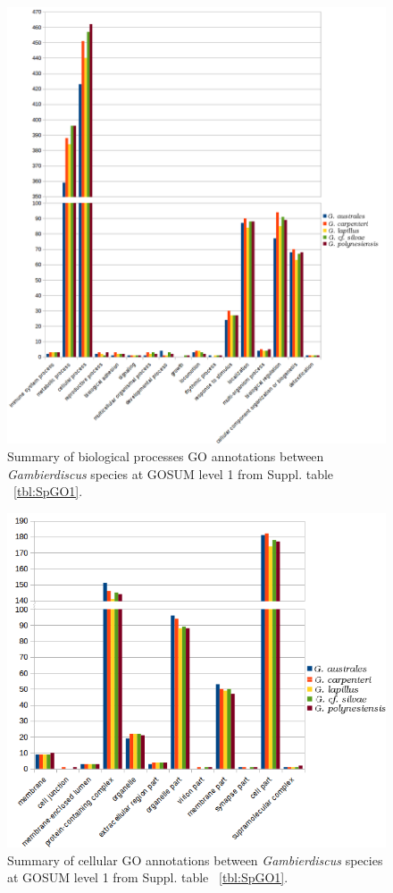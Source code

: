\documentclass[12pt]{article}
\begin{document}
\begin{figure} 
\includegraphics[scale=.7]{3Aug18_cluster-investigation/figures/gosum-species/Species-gosum1-bio-split.png} 
\caption{Summary of biological processes GO annotations between \textit{Gambierdiscus} species at GOSUM level 1 from Suppl. table ~\ref{tbl:SpGO1}.} 
\label{fig:SpecGo1Bio}
\end{figure} 
\FloatBarrier

\begin{figure} 
\includegraphics[scale=.9]{3Aug18_cluster-investigation/figures/gosum-species/Species-gosum1-cell-split.png} 
\caption{Summary of cellular GO annotations between \textit{Gambierdiscus} species at GOSUM level 1 from Suppl. table ~\ref{tbl:SpGO1}.} 
\label{fig:SpecGo1Cell}
\end{figure} 
\FloatBarrier
\end{document}
